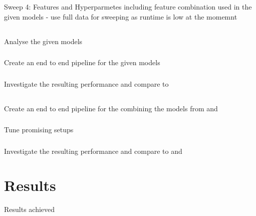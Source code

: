 \documentclass[a4paper]{article}
\begin{document}
    Sweep 4: Features and Hyperparmetes including feature combination used in the given models
    - use full data for sweeping as runtime is low at the momemnt


    \subsection*{}
    \subsubsection*{} Analyse the given models
    \subsubsection*{} Create an end to end pipeline for the given models
    \subsubsection*{} Investigate the resulting performance and compare to 

    \subsection*{}
    \subsubsection*{} Create an end to end pipeline for the combining the models from  and 
    \subsubsection*{} Tune promising setups
    \subsubsection*{} Investigate the resulting performance and compare to  and 



    \section{Results}\label{sec:results}
    Results achieved
\end{document}
